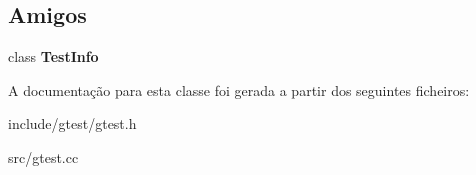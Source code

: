 \subsection*{Amigos}
\begin{DoxyCompactItemize}
\item 
\hypertarget{classtesting_1_1Test_a4c49c2cdb6c328e6b709b4542f23de3c}{class {\bfseries Test\-Info}}\label{classtesting_1_1Test_a4c49c2cdb6c328e6b709b4542f23de3c}

\end{DoxyCompactItemize}


A documentação para esta classe foi gerada a partir dos seguintes ficheiros\-:\begin{DoxyCompactItemize}
\item 
include/gtest/gtest.\-h\item 
src/gtest.\-cc\end{DoxyCompactItemize}

